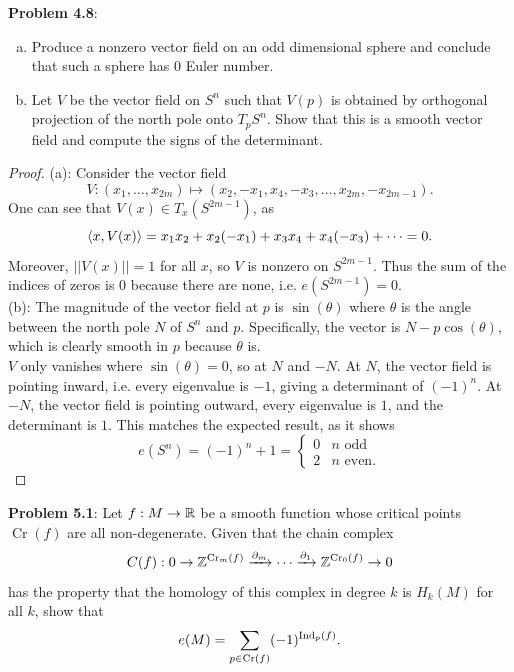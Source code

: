 \documentclass{amsart}
\DeclareMathOperator{\Cr}{\mathrm{Cr}}
\begin{document}
	\newpage 
	
	\textbf{Problem 4.8}: 
	\begin{enumerate}[(a)]
		\item Produce a nonzero vector field on an odd dimensional sphere and conclude that such a sphere has 0 Euler number.
		\item Let $V$ be the vector field on $S^n$ such that $V(p)$ is obtained by orthogonal projection of the north pole onto $T_pS^n$. Show that this is a smooth vector field and compute the signs of the determinant.
	\end{enumerate}
	\begin{proof}
		(a): Consider the vector field
		$$
		V: (x_1,\dots,x_{2m}) \mapsto (x_2,-x_1,x_4,-x_3,\dots,x_{2m},-x_{2m-1}).
		$$
		One can see that $V(x)\in T_x(S^{2m-1})$, as 
		$$
		\langle x,V(x)\rangle = x_1x_2 + x_2(-x_1) + x_3x_4 + x_4(-x_3) + \cdots = 0.
		$$
		Moreover, $||V(x)||=1$ for all $x$, so $V$ is nonzero on $S^{2m-1}$. Thus the sum of the indices of zeros is 0 because there are none, i.e. $e(S^{2m-1})=0$.\\
		
		(b): The magnitude of the vector field at $p$ is $\sin(\theta)$ where $\theta$ is the angle between the north pole $N$ of $S^n$ and $p$. Specifically, the vector is $N - p\cos(\theta)$, which is clearly smooth in $p$ because $\theta$ is.\\
		
		$V$ only vanishes where $\sin(\theta)=0$, so at $N$ and $-N$. At $N$, the vector field is pointing inward, i.e. every eigenvalue is $-1$, giving a determinant of $(-1)^n$. At $-N$, the vector field is pointing outward, every eigenvalue is $1$, and the determinant is $1$. This matches the expected result, as it shows 
		$$
		e(S^n) = (-1)^n + 1 = \begin{cases}
			0 & n \text{ odd}\\
			2 & n \text{ even}.
		\end{cases}
		$$
	\end{proof}
	
	\newpage 
	
	\textbf{Problem 5.1}: Let $f:M\to \mathbb{R}$ be a smooth function whose critical points $\Cr(f)$ are all non-degenerate. Given that the chain complex
	$$
	C(f): 0 \to \Z^{\Cr_m(f)} \xra{\partial_m} \cdots \xra{\partial_1} \Z^{\Cr_0(f)}\to 0
	$$
	has the property that the homology of this complex in degree $k$ is $H_k(M)$ for all $k$, show that 
	$$
	e(M) = \sum_{p\in \Cr(f)}(-1)^{\Ind_p(f)}.
	$$
	
\end{document}
